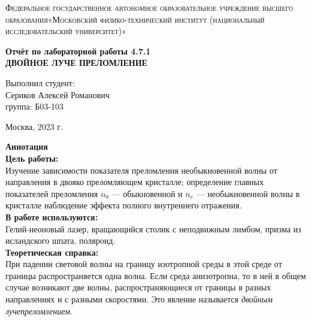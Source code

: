 \documentclass[a4paper, 12pt]{article}%
\begin{document}
	\begin{titlepage}
		\begin{center}
			\textsc{Федеральное государственное автономное образовательное учреждение высшего образования«Московский физико-технический институт (национальный исследовательский университет)»\\[5mm]
			}
			
			\vfill
			
			\textbf{Отчёт по лабораторной работы 4.7.1 \\[3mm]
				ДВОЙНОЕ ЛУЧЕ ПРЕЛОМЛЕНИЕ 
				\\[50mm]
			}
			
		\end{center}
		
		\hfill
		\begin{minipage}{.5\textwidth}
			Выполнил студент:\\[2mm]
			Сериков Алексей Романович\\[2mm]
			группа: Б03-103\\[5mm]
			
		\end{minipage}
		\vfill
		\begin{center}
			Москва, 2023 г.
		\end{center}
		
	\end{titlepage}
	
	\newpage
	\textbf{Аннотация}\\
	
	
	\textbf{Цель работы: }\\
	
Изучение зависимости показателя преломления необыкновенной волны от направления в двояко преломляющем кристалле; определение главных показателей преломления $n_0$ --- обыкновенной и $n_e$ --- необыкновенной волны в кристалле наблюдение эффекта полного внутреннего отражения.\\
	
	\textbf{В работе используются: }\\
	
	Гелий-неоновый лазер, вращающийся столик с неподвижным лимбом, призма из исландского шпата, поляроид.\\
	
	\textbf{Теоретическая справка:}\\
	
	При падении световой волны на границу изотропной среды в этой среде от границы распространяется одна волна. Если среда анизотропна, то в ней в общем случае возникают две волны, распространяющиеся от границы в разных направлениях и с разными скоростями. Это явление называется \textit{двойным лучепреломлением}.
	
\end{document}
